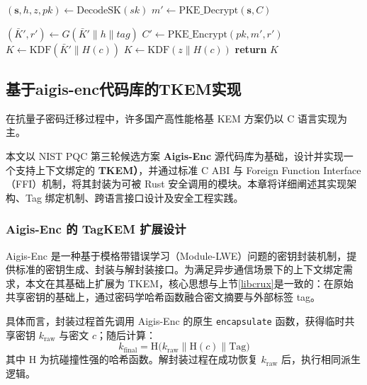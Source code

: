 \begin{algorithm}[htbp]
\caption{TKEM 解封装流程 (Decaps\_with\_tag)}
\label{alg:decaps}
\begin{algorithmic}[1]
    \State $(\mathbf{s}, h, z, pk) \gets \text{DecodeSK}(sk)$
    \State $m' \gets \text{PKE\_Decrypt}(\mathbf{s}, C)$

    \State $(\bar{K}', r') \gets G(\bar{K}' \| h \| tag)$
    \State $C' \gets \text{PKE\_Encrypt}(pk, m', r')$ 
        \State $K \gets \text{KDF}(\bar{K}' \| H(c))$ 
    \Else
        \State $K \gets \text{KDF}(z \| H(c))$ 
    \EndIf
    \State \textbf{return} $K$
\EndProcedure
\end{algorithmic}
\end{algorithm}


\subsection{基于aigis-enc代码库的TKEM实现}

在抗量子密码迁移过程中，许多国产高性能格基 KEM 方案仍以 C 语言实现为主。

本文以 NIST PQC 第三轮候选方案 \textbf{Aigis-Enc} 源代码库为基础，设计并实现一个支持上下文绑定的 \textbf{TKEM）}，并通过标准 C ABI 与 Foreign Function Interface（FFI）机制，将其封装为可被 Rust 安全调用的模块。本章将详细阐述其实现架构、Tag 绑定机制、跨语言接口设计及安全工程实践。

\subsubsection{Aigis-Enc 的 TagKEM 扩展设计}
Aigis-Enc 是一种基于模格带错误学习（Module-LWE）问题的密钥封装机制，提供标准的密钥生成、封装与解封装接口。为满足异步通信场景下的上下文绑定需求，本文在其基础上扩展为 TKEM，核心思想与上节\ref{libcrux}是一致的：在原始共享密钥的基础上，通过密码学哈希函数融合密文摘要与外部标签 tag。

具体而言，封装过程首先调用 Aigis-Enc 的原生 \texttt{encapsulate} 函数，获得临时共享密钥 \( k_{\text{raw}} \) 与密文 \( c \)；随后计算：
\[
k_{\text{final}} = \mathrm{H}\big( k_{\text{raw}} \parallel \mathrm{H}(c) \parallel \text{Tag} \big)
\]
其中 \( \mathrm{H} \) 为抗碰撞性强的哈希函数。解封装过程在成功恢复 \( k_{\text{raw}} \) 后，执行相同派生逻辑。


